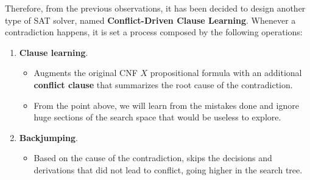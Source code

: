 Therefore, from the previous observations, it has been decided to design another type of SAT solver, named \textbf{Conflict-Driven Clause Learning}. Whenever 
a contradiction happens, it is set a process composed by the following operations:
\begin{enumerate}
    \item \textbf{Clause learning}.
    \begin{itemize}
        \renewcommand{\labelitemi}{-}
        \item Augments the original CNF $X$ propositional formula with an additional \textbf{conflict clause} that summarizes the root cause of the contradiction.
        \item From the point above, we will learn from the mistakes done and ignore huge sections of the search space that would be useless to explore.
    \end{itemize}
    \item \textbf{Backjumping}.
    \begin{itemize}
        \renewcommand{\labelitemi}{-}
        \item Based on the cause of the contradiction, skips the decisions and derivations that did not lead to conflict, going higher in the search tree.
    \end{itemize}
\end{enumerate}
